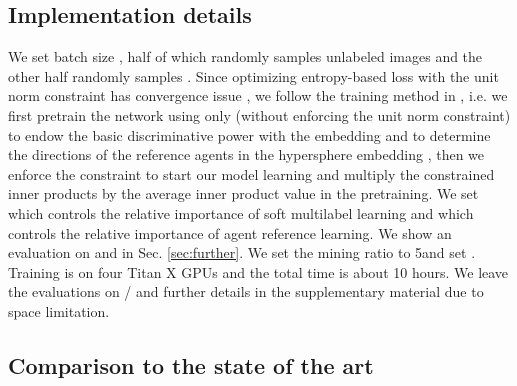 \documentclass[10pt,twocolumn,letterpaper]{article}
\begin{document}
\subsection{Implementation details}\label{sec:details}

We set batch size , half of which randomly samples unlabeled images  and the other half randomly samples .
Since optimizing entropy-based loss  with the unit norm constraint has convergence issue \cite{2017_ACMMM_normface,2016_NIPS_tuplet-loss},
we follow the training method in \cite{2017_ACMMM_normface},
i.e. we first pretrain the network using only  (without enforcing the unit norm constraint)
to endow the basic discriminative power with the embedding and to determine the directions of the reference agents
in the hypersphere embedding \cite{2017_ACMMM_normface},
then we enforce the constraint to start our model learning and multiply the constrained inner products by the average inner product value in the pretraining.
We set  which controls the relative importance of soft multilabel learning
and  which controls the relative importance of agent reference learning.
We show an evaluation on  and  in Sec. \ref{sec:further}.
We set the mining ratio  to 5\textperthousand and set .
Training is on four Titan X GPUs and the total time is about 10 hours.
We leave the evaluations on / and further details in the supplementary material due to space limitation.




\subsection{Comparison to the state of the art}
\end{document}
